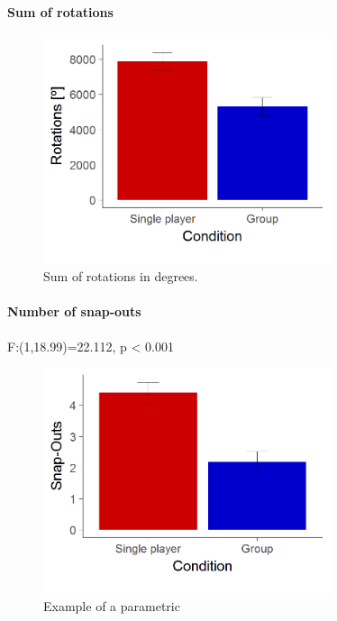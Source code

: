 \documentclass{article}
\begin{document}
\paragraph{Sum of rotations}

\begin{figure}[h]
\centering
\includegraphics[width=0.75\textwidth]{results_rotations}
\caption{Sum of rotations in degrees.}
\end{figure}

\paragraph{Number of snap-outs}
F:(1,18.99)=22.112, p < 0.001 
\begin{figure}[h]
\centering
\includegraphics[width=0.75\textwidth]{results_snap_outs}
\caption{Example of a parametric }
\end{figure}
\end{document}
